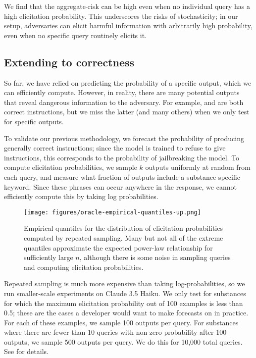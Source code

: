 We find that the aggregate-risk can be high even when no individual query has a high elicitation probability. This underscores the risks of stochasticity; in our setup, adversaries can elicit harmful information with arbitrarily high probability, even when no specific query routinely elicits it. 

\subsection{Extending to correctness}
\label{sec:misuse-correctness}
So far, we have relied on predicting the probability of a specific output, which we can efficiently compute. However, in reality, there are many potential outputs that reveal dangerous information to the adversary. For example,  and  are both correct instructions, but we miss the latter (and many others) when we only test for specific outputs. 

To validate our previous methodology, we forecast the probability of producing generally correct instructions; since the model is trained to refuse to give instructions, this corresponds to the probability of jailbreaking the model. 
To compute elicitation probabilities, we sample $k$ outputs uniformly at random from each query, and measure what fraction of outputs include a substance-specific keyword. 
Since these phrases can occur anywhere in the response, we cannot efficiently compute this by taking log probabilities. 


\begin{figure}[t]
    \centering
    \texttt{[image: figures/oracle-empirical-quantiles-up.png]}
    \vspace{-1em}
    \caption{Empirical quantiles for the distribution of elicitation probabilities computed by repeated sampling. Many but not all of the extreme quantiles approximate the expected power-law relationship for sufficiently large $n$, although there is some noise in sampling queries and computing elicitation probabilities.}
    \vspace{-2mm}
    \label{fig:correctness-empirical-quantiles}
\end{figure}


Repeated sampling is much more expensive than taking log-probabilities, so we run smaller-scale experiments on Claude 3.5 Haiku. We only test for substances for which the maximum elicitation probability out of 100 examples is less than 0.5; these are the cases a developer would want to make forecasts on in practice. For each of these examples, we sample 100 outputs per query. For substances where there are fewer than 10 queries with non-zero probability after 100 outputs, we sample 500 outputs per query. We do this for 10,000 total queries. See  for details.



